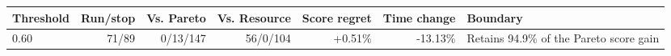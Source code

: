 \begin{tabularx}{\linewidth}{lrrrrr>{\raggedright\arraybackslash}X}
\toprule
Threshold & Run/stop & Vs. Pareto & Vs. Resource & Score regret & Time change & Boundary \\
\midrule
0.60 & 71/89 & 0/13/147 & 56/0/104 & +0.51\% & -13.13\% & Retains 94.9\% of the Pareto score gain \\
\bottomrule
\end{tabularx}
